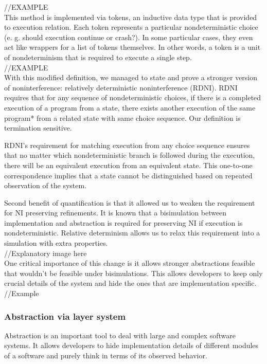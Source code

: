 \documentclass[onecolumn]{paper}
\begin{document}
//EXAMPLE\\

This method is implemented via tokens, an inductive data type that is provided to execution relation. Each token represents a particular nondeterministic choice (e. g. should execution continue or crash?). In some particular cases, they even act like wrappers for a list of tokens themselves. In other words, a token is a unit of nondeterminism that is required to execute a single step.\\

//EXAMPLE\\

With this modified definition, we managed to state and prove a stronger version of noninterference: relatively deterministic noninterference (RDNI). RDNI requires that for any sequence of nondeterministic choices, if there is a completed execution of a program from a state, there exists another execution of the same program* from a related state with same choice sequence. Our definition is termination sensitive.

RDNI's requirement for matching execution from any choice sequence ensures that no matter which nondeterministic branch is followed during the execution, there will be an equivalent execution from an equivalent state. This one-to-one correspondence implies that a state cannot be distinguished based on repeated observation of the system.

Second benefit of quantification is that it allowed us to weaken the requirement for NI preserving refinements. It is known that a bisimulation between implementation and abstraction is required for preserving NI if execution is nondeterministic. Relative determinism allows us to relax this requirement into a simulation with extra properties. \\

//Explanatory image here\\

One critical importance of this change is it allows stronger abstractions feasible that wouldn't be feasible under bisimulations. This allows developers to keep only crucial details of the system and hide the ones that are implementation specific.\\

//Example

\subsubsection*{Abstraction via layer system}
Abstraction is an important tool to deal with large and complex software systems.
It allows developers to hide implementation details of different modules of a software and purely think in terms of its observed behavior.
\end{document}
